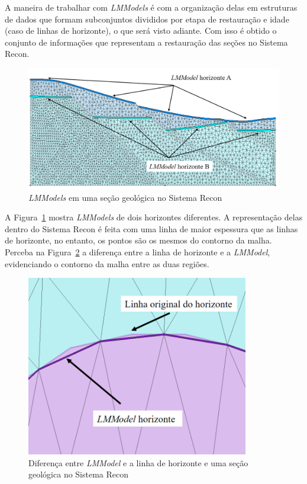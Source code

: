 A maneira de trabalhar com \textit{LMModels} é com a organização delas em estruturas de dados que formam subconjuntos divididos por etapa de restauração e idade (caso de linhas de horizonte), o que será visto adiante. Com isso é obtido o conjunto de informações que representam a restauração das seções no Sistema Recon.

\begin{figure} [h]
  \begin{center}
    \includegraphics[width=350pt]{images/fig-lmmodel-example}
    \caption{\textit{LMModels} em uma seção geológica no Sistema Recon}\label{fig-lmmodel-example}
  \end{center}
\end{figure}

A Figura~\ref{fig-lmmodel-example} mostra \textit{LMModels} de dois horizontes diferentes. A representação delas dentro do Sistema Recon é feita com uma linha de maior espessura que as linhas de horizonte, no entanto, os pontos são os mesmos do contorno da malha. Perceba na Figura~\ref{fig-lmmodel-mesh-diff} a diferença entre a linha de horizonte e a \textit{LMModel}, evidenciando o contorno da malha entre as duas regiões.

\begin{figure} [h!]
  \begin{center}
    \includegraphics[width=275pt]{images/fig-lmmodel-mesh-diff}
    \caption{Diferença entre \textit{LMModel} e a linha de horizonte e uma seção geológica no Sistema Recon}\label{fig-lmmodel-mesh-diff}
  \end{center}
\end{figure}

